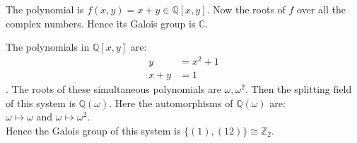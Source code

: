 \begin{example}
  The polynomial is \(f(x,y)=x+y \in \mathbb{Q}[x,y]\). Now the roots of \(f\) over all the complex numbers. Hence its Galois group is \(\mathbb{C}\).
\end{example}

\vspace{1mm}
\begin{example}
  The polynomials in \(\mathbb{Q}[x,y]\) are: \begin{align}
                         y &= x^2+1 \\
                         x+y &=1
                       \end{align}.
                       The roots of these simultaneous polynomials are \(\omega, {\omega}^2\). Then the splitting field of this system is \(\mathbb{Q}(\omega)\). Here the automorphisms of \(\mathbb{Q}(\omega)\) are: \\
       \(\omega \longmapsto \omega\) and \hspace{9mm} \(\omega \longmapsto {\omega}^2\).\\
                       Hence the Galois group of this system is \(\{(1), (12)\} \cong {\mathbb{Z}}_2\).
\end{example}

